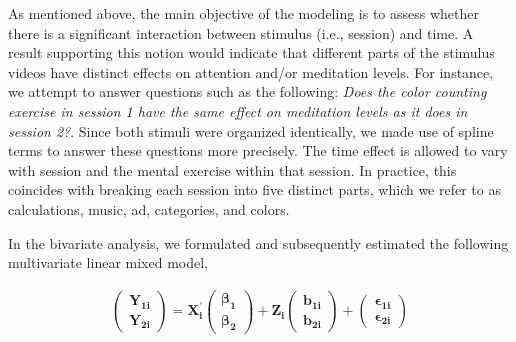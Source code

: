 \documentclass{article}[12pt]
\begin{document}
As mentioned above, the main objective of the modeling is to assess whether there is a significant interaction between stimulus (i.e., session) and time. A result supporting this notion would indicate that different parts of the stimulus videos have distinct effects on attention and/or meditation levels. For instance, we attempt to answer questions such as the following: \textit{Does the color counting exercise in session 1 have the same effect on meditation levels as it does in session 2?}. Since both stimuli were organized identically, we made use of spline terms to answer these questions more precisely. The time effect is allowed to vary with session and the mental exercise within that session. In practice, this coincides with breaking each session into five distinct parts, which we refer to as calculations, music, ad, categories, and colors.

In the bivariate analysis, we formulated and subsequently estimated the following multivariate linear mixed model,

\begin{align}
\left(\begin{array}{c}
\mathbf{Y_{1i}} \\
\mathbf{Y_{2i}}
\end{array}\right)
= \mathbf{X^\prime_{i}} 
\left(\begin{array}{c}
\boldsymbol{\beta_{1}} \\
\boldsymbol{\beta_{2}}
\end{array}\right)
+
\mathbf{Z_{i}} 
\left(\begin{array}{c}
\boldsymbol{b_{1i}} \\
\boldsymbol{b_{2i}}
\end{array}\right)
+
\left(\begin{array}{c}
\boldsymbol{\epsilon_{1i}} \\
\boldsymbol{\epsilon_{2i}}
\end{array}\right)
\end{align}
\end{document}
